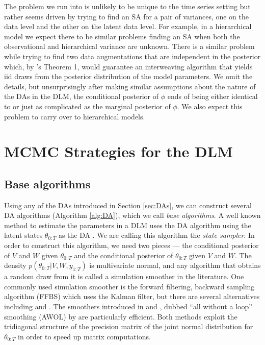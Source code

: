 \documentclass{article}
\begin{document}
The problem we run into is unlikely to be unique to the time series setting but rather seems driven by trying to find an SA for a pair of variances, one on the data level and the other on the latent data level. For example, in a hierarchical model we expect there to be similar problems finding an SA when both the observational and hierarchical variance are unknown. There is a similar problem while trying to find two data augmentations that are independent in the posterior which, by 's Theorem 1, would guarantee an interweaving algorithm that yields iid draws from the posterior distribution of the model parameters. We omit the details, but unsurprisingly after making similar assumptions about the nature of the DAs in the DLM, the conditional posterior of $\phi$ ends of being either identical to or just as complicated as the marginal posterior of $\phi$. We also expect this problem to carry over to hierarchical models.

\section{MCMC Strategies for the DLM}\label{sec:Algs}

\subsection{Base algorithms}\label{sec:Algs:base}
Using any of the DAs introduced in Section \ref{sec:DAs}, we can construct several DA algorithms (Algorithm \ref{alg:DA}), which we call {\it base algorithms}. A well known method to estimate the parameters in a DLM uses the DA algorithm using the latent states $\theta_{0:T}$ as the DA \cite{fruhwirth1994data,carter1994gibbs}. We are calling this algorithm the {\it state sampler}. In order to construct this algorithm, we need two pieces --- the conditional posterior of $V$ and $W$ given $\theta_{0:T}$ and the conditional posterior of $\theta_{0:T}$ given $V$ and $W$. The density $p(\theta_{0:T}|V,W,y_{1:T})$ is multivariate normal, and any algorithm that obtains a random draw from it is called a simulation smoother in the literature. One commonly used simulation smoother is the forward filtering, backward sampling algorithm (FFBS) \cite{fruhwirth1994data,carter1994gibbs} which uses the Kalman filter, but there are several alternatives including  and . The smoothers introduced in  and , dubbed ``all without a loop'' smoothing (AWOL) by  are particularly efficient. Both methods exploit the tridiagonal structure of the precision matrix of the joint normal distribution for $\theta_{0:T}$ in order to speed up matrix computations. 
\end{document}
